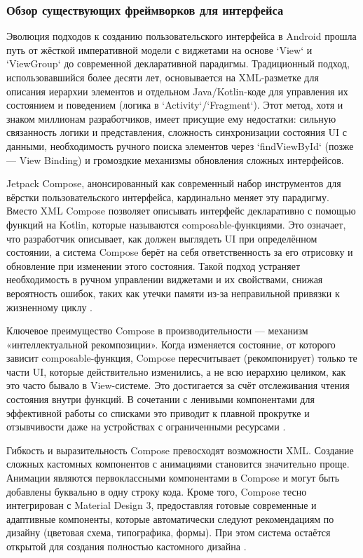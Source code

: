 \subsubsection{Обзор существующих фреймворков для интерфейса}

Эволюция подходов к созданию пользовательского интерфейса в Android прошла путь от жёсткой императивной модели с виджетами на основе `View` и `ViewGroup` до современной декларативной парадигмы. Традиционный подход, использовавшийся более десяти лет, основывается на XML-разметке для описания иерархии элементов и отдельном Java/Kotlin-коде для управления их состоянием и поведением (логика в `Activity`/`Fragment`). Этот метод, хотя и знаком миллионам разработчиков, имеет присущие ему недостатки: сильную связанность логики и представления, сложность синхронизации состояния UI с данными, необходимость ручного поиска элементов через `findViewById` (позже — View Binding) и громоздкие механизмы обновления сложных интерфейсов.

Jetpack Compose, анонсированный как современный набор инструментов для вёрстки пользовательского интерфейса, кардинально меняет эту парадигму. Вместо XML Compose позволяет описывать интерфейс декларативно с помощью функций на Kotlin, которые называются composable-функциями. Это означает, что разработчик описывает, как должен выглядеть UI при определённом состоянии, а система Compose берёт на себя ответственность за его отрисовку и обновление при изменении этого состояния. Такой подход устраняет необходимость в ручном управлении виджетами и их свойствами, снижая вероятность ошибок, таких как утечки памяти из-за неправильной привязки к жизненному циклу \cite{refd}.

Ключевое преимущество Compose в производительности — механизм «интеллектуальной рекомпозиции». Когда изменяется состояние, от которого зависит composable-функция, Compose пересчитывает (рекомпонирует) только те части UI, которые действительно изменились, а не всю иерархию целиком, как это часто бывало в View-системе. Это достигается за счёт отслеживания чтения состояния внутри функций. В сочетании с ленивыми компонентами для эффективной работы со списками это приводит к плавной прокрутке и отзывчивости даже на устройствах с ограниченными ресурсами \cite{refd}.

Гибкость и выразительность Compose превосходят возможности XML. Создание сложных кастомных компонентов с анимациями становится значительно проще. Анимации являются первоклассными компонентами в Compose и могут быть добавлены буквально в одну строку кода. Кроме того, Compose тесно интегрирован с Material Design 3, предоставляя готовые современные и адаптивные компоненты, которые автоматически следуют рекомендациям по дизайну (цветовая схема, типографика, формы). При этом система остаётся открытой для создания полностью кастомного дизайна \cite{refd}.

